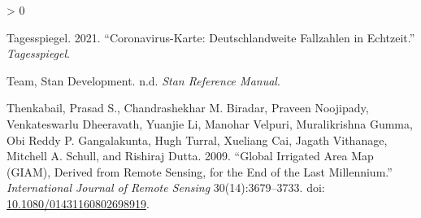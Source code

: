 \documentclass[12pt,twoside]{reedthesis}
\newlength{\cslhangindent}
\newenvironment{CSLReferences}[2] %
 {%
  \setlength{\parindent}{0pt}
  \ifodd #1 \everypar{\setlength{\hangindent}{\cslhangindent}}\ignorespaces\fi
  \ifnum #2 > 0
  \setlength{\parskip}{#2\baselineskip}
  \fi
 }%
 {}
\begin{document}
\begin{CSLReferences}{1}{0}
\leavevmode\hypertarget{ref-tagesspiegelCoronavirusKarteDeutschlandweiteFallzahlen2021}{}%
Tagesspiegel. 2021. {``Coronavirus-{Karte}: {Deutschlandweite Fallzahlen} in {Echtzeit}.''} \emph{Tagesspiegel}.

\leavevmode\hypertarget{ref-teamStanReferenceManual}{}%
Team, Stan Development. n.d. \emph{Stan {Reference Manual}}.

\leavevmode\hypertarget{ref-thenkabailGlobalIrrigatedArea2009}{}%
Thenkabail, Prasad S., Chandrashekhar M. Biradar, Praveen Noojipady, Venkateswarlu Dheeravath, Yuanjie Li, Manohar Velpuri, Muralikrishna Gumma, Obi Reddy P. Gangalakunta, Hugh Turral, Xueliang Cai, Jagath Vithanage, Mitchell A. Schull, and Rishiraj Dutta. 2009. {``Global Irrigated Area Map ({GIAM}), Derived from Remote Sensing, for the End of the Last Millennium.''} \emph{International Journal of Remote Sensing} 30(14):3679--3733. doi: \href{https://doi.org/10.1080/01431160802698919}{10.1080/01431160802698919}.

\end{CSLReferences}

\end{document}
